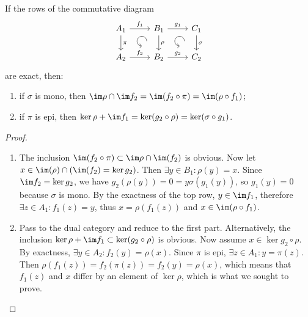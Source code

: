 \begin{lem}[3-lemma]
    If the rows of the commutative diagram 
    \[\begin{tikzcd}[every matrix/.append style={name=m},   
        execute at end picture={\draw [<-] ([xshift=-7mm,yshift=-10mm]m-1-2.north) arc[start angle=-90,delta angle=-270,radius=0.2cm];
        \draw [<-] ([xshift=-7mm,yshift=-10mm]m-1-3.north) arc[start angle=-90,delta angle=-270,radius=0.2cm];}]
        A_1 \arrow[r,"f_1"]\arrow[d,"\pi"] & B_1\arrow[d,"\rho"]\arrow[r,"g_1"] & C_1\arrow[d,"\sigma"] \\
        A_2\arrow[r,"f_2"] &B_2 \arrow[r,"g_2"] &C_2 
    \end{tikzcd}\]
    are exact, then:
    \begin{enumerate}
        \item if $\sigma$ is mono, then $\im\rho\cap\im f_2=\im(f_2\circ \pi)=\im(\rho\circ f_1)$;
        \item if $\pi$ is epi, then $\ker\rho+\im f_1=\ker(g_2\circ\rho)=\ker(\sigma\circ g_1)$.
    \end{enumerate}
\end{lem}
\begin{proof}
    \begin{enumerate}
        \item The inclusion $\im(f_2\circ\pi)\subset \im\rho\cap \im(f_2)$ is obvious. Now let $x\in \im(\rho)\cap(\im(f_2)=\ker g_2)$. Then $\exists y\in B_1: \rho(y)=x$. Since $\im f_2=\ker g_2$, we have $g_2(\rho(y))=0=y\sigma(g_1(y))$, so $g_1(y)=0$ because $\sigma$ is mono. By the exactness of the top row, $y\in\im f_1$, therefore $\exists z\in A_1:f_1(z)=y$, thus $x=\rho(f_1(z))$ and $x\in\im(\rho\circ f_1)$.
        \item Pass to the dual category and reduce to the first part. Alternatively, the inclusion $\ker\rho+\im f_1\subset \ker(g_2\circ\rho)$ is obvious. Now assume $x\in \ker g_2\circ\rho$. By exactness, $\exists y\in A_2:f_2(y)=\rho(x)$. Since $\pi$ is epi, $\exists z\in A_1:y=\pi(z)$. Then $\rho(f_1(z))=f_2(\pi(z))=f_2(y)=\rho(x)$, which means that $f_1(z)$ and $x$ differ by an element of $\ker\rho$, which is what we sought to prove.
    \end{enumerate}
\end{proof}

